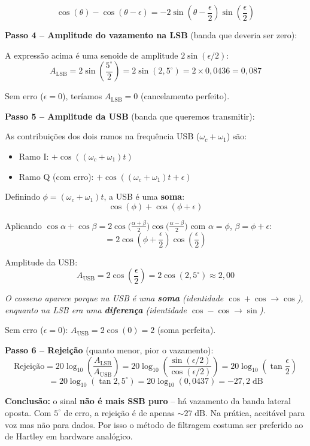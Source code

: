 \documentclass[11pt,a4paper]{article}
\begin{document}
\begin{resolucao}
\[
  \cos(\theta) - \cos(\theta - \epsilon) = -2\sin\!\left(\theta - \frac{\epsilon}{2}\right)\sin\!\left(\frac{\epsilon}{2}\right)
\]

\textbf{Passo 4 -- Amplitude do vazamento na LSB} (banda que deveria ser zero):

A expressão acima é uma senoide de amplitude $2\sin(\epsilon/2)$:
\[
  A_{\text{LSB}} = 2\sin\!\left(\frac{5^\circ}{2}\right) = 2\sin(2{,}5^\circ) = 2 \times 0{,}0436 = 0{,}087
\]

Sem erro ($\epsilon = 0$), teríamos $A_{\text{LSB}} = 0$ (cancelamento perfeito).

\textbf{Passo 5 -- Amplitude da USB} (banda que queremos transmitir):

As contribuições dos dois ramos na frequência USB ($\omega_c + \omega_1$) são:
\begin{itemize}
  \item Ramo I: $+\cos((\omega_c + \omega_1)t)$
  \item Ramo Q (com erro): $+\cos((\omega_c + \omega_1)t + \epsilon)$
\end{itemize}

Definindo $\phi = (\omega_c + \omega_1)t$, a USB é uma \textbf{soma}:
\[
  \cos(\phi) + \cos(\phi + \epsilon)
\]

Aplicando $\cos\alpha + \cos\beta = 2\cos\!\Big(\!\frac{\alpha+\beta}{2}\!\Big)\cos\!\Big(\!\frac{\alpha-\beta}{2}\!\Big)$ com $\alpha = \phi$, $\beta = \phi + \epsilon$:
\[
  = 2\cos\!\left(\phi + \frac{\epsilon}{2}\right)\cos\!\left(\frac{\epsilon}{2}\right)
\]

Amplitude da USB:
\[
  A_{\text{USB}} = 2\cos\!\left(\frac{\epsilon}{2}\right) = 2\cos(2{,}5^\circ) \approx 2{,}00
\]

\textit{O cosseno aparece porque na USB é uma \textbf{soma} (identidade $\cos + \cos \to \cos$), enquanto na LSB era uma \textbf{diferença} (identidade $\cos - \cos \to \sin$).}

Sem erro ($\epsilon = 0$): $A_{\text{USB}} = 2\cos(0) = 2$ (soma perfeita).

\textbf{Passo 6 -- Rejeição} (quanto menor, pior o vazamento):
\[
  \text{Rejeição} = 20\log_{10}\!\left(\frac{A_{\text{LSB}}}{A_{\text{USB}}}\right) = 20\log_{10}\!\left(\frac{\sin(\epsilon/2)}{\cos(\epsilon/2)}\right) = 20\log_{10}\!\left(\tan\frac{\epsilon}{2}\right)
\]
\[
  = 20\log_{10}(\tan 2{,}5^\circ) = 20\log_{10}(0{,}0437) = \boxed{-27{,}2\;\text{dB}}
\]

\textbf{Conclusão:} o sinal \textbf{não é mais SSB puro} -- há vazamento da banda lateral oposta. Com $5^\circ$ de erro, a rejeição é de apenas $\sim27\;\text{dB}$. Na prática, aceitável para voz mas não para dados. Por isso o método de filtragem costuma ser preferido ao de Hartley em hardware analógico.
\end{resolucao}
\end{document}
